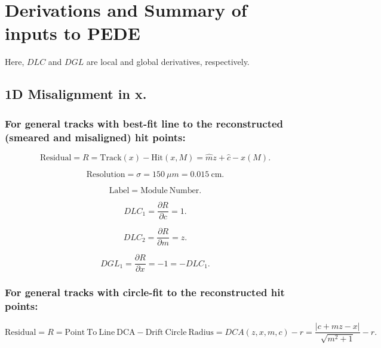 \documentclass[a4paper,11pt]{article}
\begin{document}
\section{Derivations and Summary of inputs to PEDE} \label{sec:deriv}
Here, $DLC$ and $DGL$ are local and global derivatives, respectively. 

\subsection{1D Misalignment in x.}

\subsubsection{For general tracks with best-fit line to the reconstructed (smeared and misaligned) hit points:}
\begin{equation}
\mathrm{Residual} = R = \mathrm{Track}(x) - \mathrm{Hit}(x,M) = \hat{m}z+\hat{c} - x(M).
\end{equation}

\begin{equation}	
\mathrm{Resolution} = \sigma = 150 \ \mu m = 0.015 \ \mathrm{cm}.
\end{equation}

\begin{equation}	
\mathrm{Label}= \mathrm{Module \ Number}.
\end{equation}

\begin{equation}
DLC_1 = \frac{ \partial R}{\partial c} = 1.
\end{equation}

\begin{equation}
DLC_2 = \frac{ \partial R}{\partial m} = z.
\end{equation}

\begin{equation}
DGL_1 = \frac{ \partial R}{\partial x} = -1 = - DLC_1.
\end{equation}

\subsubsection{For general tracks with circle-fit to the reconstructed hit points:}

\begin{equation}	
\mathrm{Residual}= R =\mathrm{Point \ To \ Line \ DCA} - \mathrm{Drift \ Circle \ Radius} = DCA(z,x,m,c) - r = \frac{ |c+mz-x| }  { \sqrt{m^2+1} } -r.
\end{equation}
\end{document}
